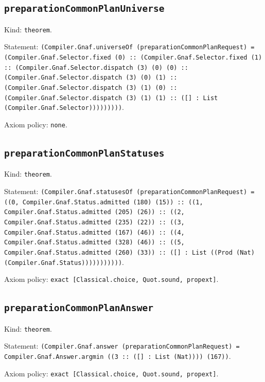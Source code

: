 \documentclass[11pt]{article}
\begin{document}
\subsection*{\texttt{preparationCommonPlanUniverse}}
\noindent Kind: \texttt{theorem}.\par
\noindent Statement: \texttt{(Compiler.Gnaf.universeOf (preparationCommonPlanRequest) = (Compiler.Gnaf.Selector.fixed (0) :: (Compiler.Gnaf.Selector.fixed (1) :: (Compiler.Gnaf.Selector.dispatch (3) (0) (0) :: (Compiler.Gnaf.Selector.dispatch (3) (0) (1) :: (Compiler.Gnaf.Selector.dispatch (3) (1) (0) :: (Compiler.Gnaf.Selector.dispatch (3) (1) (1) :: ([] : List (Compiler.Gnaf.Selector)))))))))}.\par
\noindent Axiom policy: \texttt{none}.\par
\subsection*{\texttt{preparationCommonPlanStatuses}}
\noindent Kind: \texttt{theorem}.\par
\noindent Statement: \texttt{(Compiler.Gnaf.statusesOf (preparationCommonPlanRequest) = ((0, Compiler.Gnaf.Status.admitted (180) (15)) :: ((1, Compiler.Gnaf.Status.admitted (205) (26)) :: ((2, Compiler.Gnaf.Status.admitted (235) (22)) :: ((3, Compiler.Gnaf.Status.admitted (167) (46)) :: ((4, Compiler.Gnaf.Status.admitted (328) (46)) :: ((5, Compiler.Gnaf.Status.admitted (260) (33)) :: ([] : List ((Prod (Nat) (Compiler.Gnaf.Status)))))))))))}.\par
\noindent Axiom policy: \texttt{exact [Classical.choice, Quot.sound, propext]}.\par
\subsection*{\texttt{preparationCommonPlanAnswer}}
\noindent Kind: \texttt{theorem}.\par
\noindent Statement: \texttt{(Compiler.Gnaf.answer (preparationCommonPlanRequest) = Compiler.Gnaf.Answer.argmin ((3 :: ([] : List (Nat)))) (167))}.\par
\noindent Axiom policy: \texttt{exact [Classical.choice, Quot.sound, propext]}.\par
\end{document}
